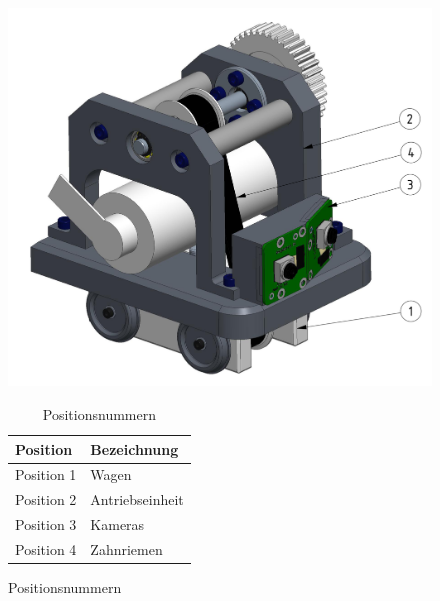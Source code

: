 \documentclass[../../main.tex]{subfiles}
\begin{document}
\begin{figure}[H]
\begin{minipage}{.6\textwidth}
  \includegraphics[width=.9\textwidth]{antriebswagen.PNG} 
   \caption[]{Konzept Antriebswagen}
   \label{fig:antriebswagen1}
 \end{minipage}
\begin{minipage}{.4\textwidth}
\begin{table}[H] \centering
  \begin{tabular}{|l|l|}
  \hline
  \textbf{Position} & \textbf{Bezeichnung}\\
  \hline
  Position 1          & Wagen\\
   \hline
  Position 2          & Antriebseinheit\\
  \hline
  Position 3          & Kameras\\
  \hline
  Position 4          & Zahnriemen\\
  \hline
 \end{tabular}
 \caption{Positionsnummern}
 \label{tab:expl_antriebswagen}
 \end{table} 
 \end{minipage} 
\end{figure} 
\end{document}
